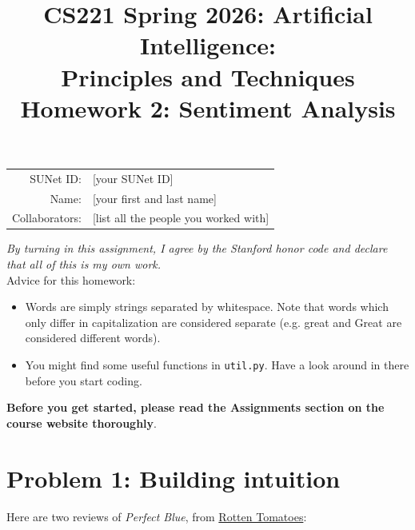 \documentclass{article}
\title{\textbf{CS221 Spring 2026: Artificial Intelligence:\\ Principles and Techniques} \\Homework 2: Sentiment Analysis}
\date{}
\theoremstyle{case}
\theoremstyle{definition}
\begin{document}
\maketitle

\begin{center}
\begin{tabular}{rl}
SUNet ID: & [your SUNet ID] \\
Name: & [your first and last name] \\
Collaborators: & [list all the people you worked with]
\end{tabular}
\end{center}
\textit{By turning in this assignment, I agree by the Stanford honor code and declare
that all of this is my own work.} \\
\fontsize{12pt}{16pt}\selectfont
Advice for this homework:
\begin{itemize}
    \item Words are simply strings separated by whitespace. Note that words which only differ in capitalization are considered separate (e.g. great and Great are considered different words).
    \item You might find some useful functions in \texttt{util.py}. Have a look around in there before you start coding.
\end{itemize}
\textbf{Before you get started, please read the Assignments section on the course website thoroughly}.


\section*{Problem 1: Building intuition}

Here are two reviews of \textit{Perfect Blue}, from \href{https://www.rottentomatoes.com/}{Rotten Tomatoes}: \newline
\end{document}
